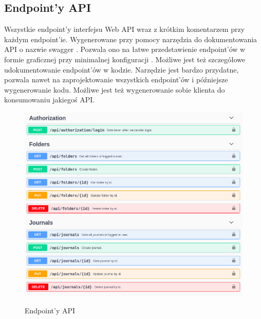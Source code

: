 \documentclass[a4paper,11pt]{report}
\begin{document}
\subsection{Endpoint'y API}
Wszystkie endpoint'y interfejsu Web API wraz z krótkim komentarzem przy każdym endpoint'ie.
Wygenerowane przy pomocy narzędzia do dokumentowania API o nazwie swagger \cite{swagger}.
Pozwala ono na łatwe przedstawienie endpoint'ów w formie graficznej przy minimalnej konfiguracji \cite{swagger-dotnet}.
Możliwe jest też szczegółowe udokumentowanie endpoint'ów w kodzie.
Narzędzie jest bardzo przydatne, pozwala nawet na zaprojektowanie wszystkich endpoint'ów i późniejsze wygenerowanie kodu.
Możliwe jest też wygenerowanie sobie klienta do konsumowaniu jakiegoś API.
\begin{figure}[H]
	\centering
	\includegraphics[scale=0.5]{implementacja/backend/auth_folders_journals_api}\\
	\caption{Endpoint'y API}
	\label{fig:auth_folders_journals_api}
\end{figure}
\end{document}
